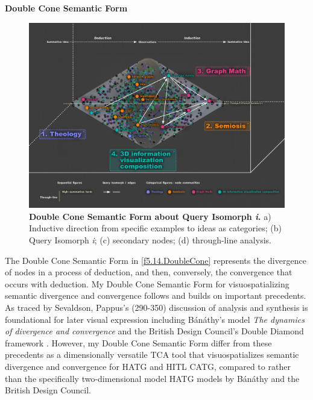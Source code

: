 \noindent  \textbf{Double Cone Semantic Form}
\FloatBarrier  
\begin{figure}[h!]
    \centering
    \includegraphics[width=\textwidth]{figures/5.14.DoubleCone.png}
    \caption[Double Cone Semantic Form about Query Isomorph \textit{i}]{\textbf{Double Cone Semantic Form about Query Isomorph \textit{i}.} a) Inductive direction from specific examples to ideas as categories; (b) Query Isomorph \textit{i}; (c) secondary nodes; (d) through-line analysis.}
    \label{f5.14.DoubleCone}
\end{figure}
\FloatBarrier  

The Double Cone Semantic Form in \autoref{f5.14.DoubleCone} represents the divergence of nodes in a process of deduction, and then, conversely, the convergence that occurs with deduction. My Double Cone Semantic Form for visuospatializing semantic divergence and convergence follows and builds on important precedents. As traced by Sevaldson, Pappus's (290-350) discussion of analysis and synthesis \citep[p. 7]{hinitikka_method_1974} is foundational for later visual expression including Bánáthy’s model \textit{The dynamics of divergence and convergence} \citep[p. 75]{banathy_designing_1996} and the British Design Council's Double Diamond framework \citep{design_council_history_nodate}. However, my Double Cone Semantic Form differ from these precedents as a dimensionally versatile TCA tool that visuospatializes semantic divergence and convergence for HATG and HITL CATG, compared to rather than the specifically two-dimensional model HATG models by Bánáthy and the British Design Council.

